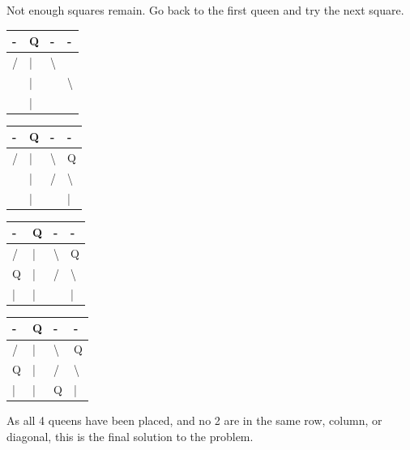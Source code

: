 \documentclass{article}
\begin{document}
\begin{enumerate}
Not enough squares remain. Go back to the first queen and try the next square. 

\begin{table}[H]
\begin{tabular}{|l|l|l|l|}
\hline
- & Q & - & - \\ \hline
/ & | & \textbackslash{} &  \\ \hline
 & | &  & \textbackslash{} \\ \hline
 & | &  &  \\ \hline
\end{tabular}
\end{table}


\begin{table}[H]
\begin{tabular}{|l|l|l|l|}
\hline
- & Q & - & - \\ \hline
/ & | & \textbackslash{} & Q \\ \hline
 & | & / & \textbackslash{} \\ \hline
 & | &  & | \\ \hline
\end{tabular}
\end{table}


\begin{table}[H]
\begin{tabular}{|l|l|l|l|}
\hline
- & Q & - & - \\ \hline
/ & | & \textbackslash{} & Q \\ \hline
Q & | & / & \textbackslash{} \\ \hline
| & | &  & | \\ \hline
\end{tabular}
\end{table}


\begin{table}[H]
\begin{tabular}{|l|l|l|l|}
\hline
- & Q & - & - \\ \hline
/ & | & \textbackslash{} & Q \\ \hline
Q & | & / & \textbackslash{} \\ \hline
| & | & Q & | \\ \hline
\end{tabular}
\end{table}

As all 4 queens have been placed, and no 2 are in the same row, column, or diagonal, this is the final solution to the problem. 






\end{enumerate}
\end{document}
